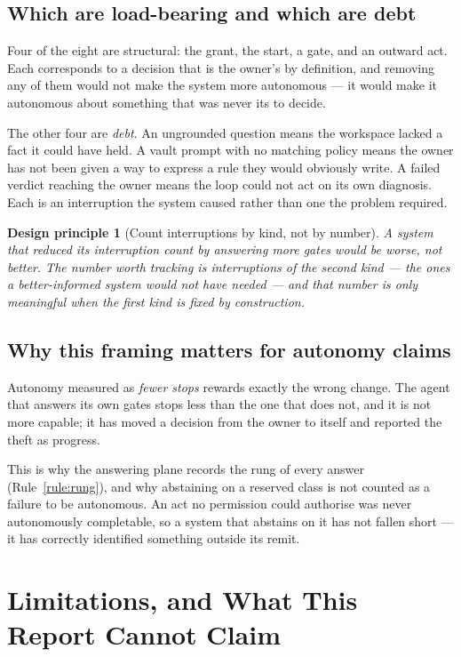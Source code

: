 \documentclass[11pt]{article}
\newtheorem{principle}{Design principle}
\begin{document}
\subsection{Which are load-bearing and which are debt}

Four of the eight are structural: the grant, the start, a gate, and an outward act. Each corresponds to a decision that is the owner's by definition, and removing any of them would not make the system more autonomous --- it would make it autonomous about something that was never its to decide.

The other four are \emph{debt}. An ungrounded question means the workspace lacked a fact it could have held. A vault prompt with no matching policy means the owner has not been given a way to express a rule they would obviously write. A failed verdict reaching the owner means the loop could not act on its own diagnosis. Each is an interruption the system caused rather than one the problem required.

\begin{principle}[Count interruptions by kind, not by number]
\label{prin:interrupt}
A system that reduced its interruption count by answering more gates would be worse, not better. The number worth tracking is interruptions of the second kind --- the ones a better-informed system would not have needed --- and that number is only meaningful when the first kind is fixed by construction.
\end{principle}

\subsection{Why this framing matters for autonomy claims}

Autonomy measured as \emph{fewer stops} rewards exactly the wrong change. The agent that answers its own gates stops less than the one that does not, and it is not more capable; it has moved a decision from the owner to itself and reported the theft as progress.

This is why the answering plane records the rung of every answer (Rule~\ref{rule:rung}), and why abstaining on a reserved class is not counted as a failure to be autonomous. An act no permission could authorise was never autonomously completable, so a system that abstains on it has not fallen short --- it has correctly identified something outside its remit.

\section{Limitations, and What This Report Cannot Claim}
\label{sec:limits}
\end{document}
